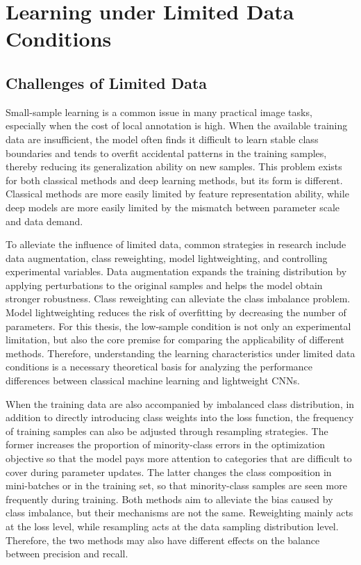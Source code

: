 \section{Learning under Limited Data Conditions}
\subsection{Challenges of Limited Data}
\par Small-sample learning is a common issue in many practical image tasks,
especially when the cost of local annotation is high. When the available
training data are insufficient, the model often finds it difficult to learn
stable class boundaries and tends to overfit accidental patterns in the
training samples, thereby reducing its generalization ability on new samples.
This problem exists for both classical methods and deep learning methods, but
its form is different. Classical methods are more easily limited by feature
representation ability, while deep models are more easily limited by the
mismatch between parameter scale and data demand.

\par To alleviate the influence of limited data, common strategies in research
include data augmentation, class reweighting, model lightweighting, and
controlling experimental variables. Data augmentation expands the training
distribution by applying perturbations to the original samples and helps the
model obtain stronger robustness. Class reweighting can alleviate the class
imbalance problem. Model lightweighting reduces the risk of overfitting by
decreasing the number of parameters. For this thesis, the low-sample condition
is not only an experimental limitation, but also the core premise for
comparing the applicability of different methods. Therefore, understanding the
learning characteristics under limited data conditions is a necessary
theoretical basis for analyzing the performance differences between classical
machine learning and lightweight CNNs.

\par When the training data are also accompanied by imbalanced class
distribution, in addition to directly introducing class weights into the loss
function, the frequency of training samples can also be adjusted through
resampling strategies. The former increases the proportion of minority-class
errors in the optimization objective so that the model pays more attention to
categories that are difficult to cover during parameter updates. The latter
changes the class composition in mini-batches or in the training set, so that
minority-class samples are seen more frequently during training. Both methods
aim to alleviate the bias caused by class imbalance, but their mechanisms are
not the same. Reweighting mainly acts at the loss level, while resampling acts
at the data sampling distribution level. Therefore, the two methods may also
have different effects on the balance between precision and recall.

